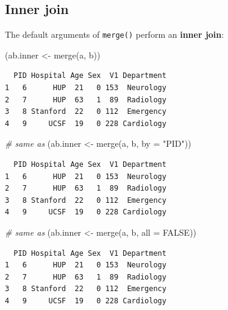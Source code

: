 \documentclass[
]{book}
\newenvironment{Shaded}{\begin{snugshade}}{\end{snugshade}}
\newcommand{\AttributeTok}[1]{\textcolor[rgb]{0.77,0.63,0.00}{#1}}
\newcommand{\CommentTok}[1]{\textcolor[rgb]{0.56,0.35,0.01}{\textit{#1}}}
\newcommand{\ConstantTok}[1]{\textcolor[rgb]{0.00,0.00,0.00}{#1}}
\newcommand{\FunctionTok}[1]{\textcolor[rgb]{0.00,0.00,0.00}{#1}}
\newcommand{\NormalTok}[1]{#1}
\newcommand{\OtherTok}[1]{\textcolor[rgb]{0.56,0.35,0.01}{#1}}
\newcommand{\StringTok}[1]{\textcolor[rgb]{0.31,0.60,0.02}{#1}}
\begin{document}
\hypertarget{inner-join}{%
\subsection{Inner join}\label{inner-join}}

The default arguments of \texttt{merge()} perform an \textbf{inner join}:

\begin{Shaded}
\begin{Highlighting}[]
\NormalTok{(ab.inner }\OtherTok{\textless{}{-}} \FunctionTok{merge}\NormalTok{(a, b))}
\end{Highlighting}
\end{Shaded}

\begin{verbatim}
  PID Hospital Age Sex  V1 Department
1   6      HUP  21   0 153  Neurology
2   7      HUP  63   1  89  Radiology
3   8 Stanford  22   0 112  Emergency
4   9     UCSF  19   0 228 Cardiology
\end{verbatim}

\begin{Shaded}
\begin{Highlighting}[]
\CommentTok{\# same as}
\NormalTok{(ab.inner }\OtherTok{\textless{}{-}} \FunctionTok{merge}\NormalTok{(a, b, }\AttributeTok{by =} \StringTok{"PID"}\NormalTok{))}
\end{Highlighting}
\end{Shaded}

\begin{verbatim}
  PID Hospital Age Sex  V1 Department
1   6      HUP  21   0 153  Neurology
2   7      HUP  63   1  89  Radiology
3   8 Stanford  22   0 112  Emergency
4   9     UCSF  19   0 228 Cardiology
\end{verbatim}

\begin{Shaded}
\begin{Highlighting}[]
\CommentTok{\# same as}
\NormalTok{(ab.inner }\OtherTok{\textless{}{-}} \FunctionTok{merge}\NormalTok{(a, b, }\AttributeTok{all =} \ConstantTok{FALSE}\NormalTok{))}
\end{Highlighting}
\end{Shaded}

\begin{verbatim}
  PID Hospital Age Sex  V1 Department
1   6      HUP  21   0 153  Neurology
2   7      HUP  63   1  89  Radiology
3   8 Stanford  22   0 112  Emergency
4   9     UCSF  19   0 228 Cardiology
\end{verbatim}
\end{document}
